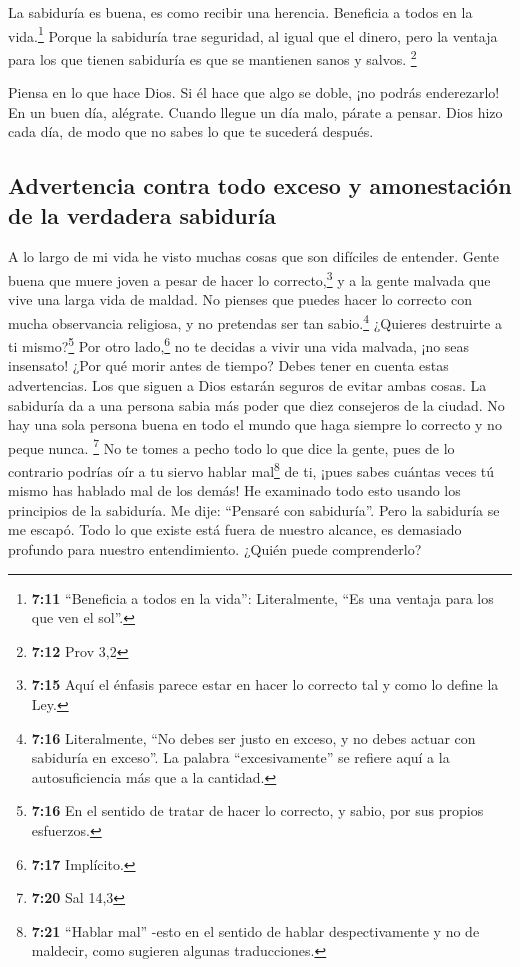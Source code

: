  La sabiduría es buena, es como recibir una herencia.
Beneficia a todos en la vida.\footnote{\textbf{7:11} ``Beneficia a todos
  en la vida'': Literalmente, ``Es una ventaja para los que ven el
  sol''.}  Porque la sabiduría trae seguridad, al igual
que el dinero, pero la ventaja para los que tienen sabiduría es que se
mantienen sanos y salvos. \footnote{\textbf{7:12} Prov 3,2}

 Piensa en lo que hace Dios. Si él hace que algo se
doble, ¡no podrás enderezarlo!  En un buen día, alégrate.
Cuando llegue un día malo, párate a pensar. Dios hizo cada día, de modo
que no sabes lo que te sucederá después.

\hypertarget{advertencia-contra-todo-exceso-y-amonestaciuxf3n-de-la-verdadera-sabiduruxeda}{%
\subsection{Advertencia contra todo exceso y amonestación de la
verdadera
sabiduría}\label{advertencia-contra-todo-exceso-y-amonestaciuxf3n-de-la-verdadera-sabiduruxeda}}

 A lo largo de mi vida he visto muchas cosas que son
difíciles de entender. Gente buena que muere joven a pesar de hacer lo
correcto,\footnote{\textbf{7:15} Aquí el énfasis parece estar en hacer
  lo correcto tal y como lo define la Ley.} y a la gente malvada que
vive una larga vida de maldad.  No pienses que puedes
hacer lo correcto con mucha observancia religiosa, y no pretendas ser
tan sabio.\footnote{\textbf{7:16} Literalmente, ``No debes ser justo en
  exceso, y no debes actuar con sabiduría en exceso''. La palabra
  ``excesivamente'' se refiere aquí a la autosuficiencia más que a la
  cantidad.} ¿Quieres destruirte a ti mismo?\footnote{\textbf{7:16} En
  el sentido de tratar de hacer lo correcto, y sabio, por sus propios
  esfuerzos.}  Por otro lado,\footnote{\textbf{7:17}
  Implícito.} no te decidas a vivir una vida malvada, ¡no seas
insensato! ¿Por qué morir antes de tiempo?  Debes tener
en cuenta estas advertencias. Los que siguen a Dios estarán seguros de
evitar ambas cosas.  La sabiduría da a una persona sabia
más poder que diez consejeros de la ciudad.  No hay una
sola persona buena en todo el mundo que haga siempre lo correcto y no
peque nunca. \footnote{\textbf{7:20} Sal 14,3}  No te
tomes a pecho todo lo que dice la gente, pues de lo contrario podrías
oír a tu siervo hablar mal\footnote{\textbf{7:21} ``Hablar mal'' -esto
  en el sentido de hablar despectivamente y no de maldecir, como
  sugieren algunas traducciones.} de ti,  ¡pues sabes
cuántas veces tú mismo has hablado mal de los demás!  He
examinado todo esto usando los principios de la sabiduría. Me dije:
``Pensaré con sabiduría''. Pero la sabiduría se me escapó.
 Todo lo que existe está fuera de nuestro alcance, es
demasiado profundo para nuestro entendimiento. ¿Quién puede
comprenderlo?

